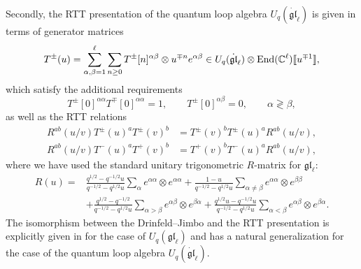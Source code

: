 Secondly, the RTT presentation \cite{molev_yangians_2007} of the quantum loop algebra $U_q(\dot{\mathfrak{gl}}_\ell)$ is given in terms of generator matrices
\begin{equation}
    T^\pm(u) = \sum_{\alpha,\beta=1}^\ell \sum_{n \geq 0} T^\pm[n]^{\alpha\beta} \otimes u^{\mp n} e^{\alpha\beta} \in U_q(\dot{\mathfrak{gl}}_\ell) \otimes \operatorname{End}(\mathbb{C}^\ell)\llbracket u^{\mp 1} \rrbracket,
\end{equation}
which satisfy the additional requirements 
\begin{equation}
    T^\pm[0]^{\alpha\alpha} T^\mp[0]^{\alpha\alpha} = 1, \qquad T^\pm[0]^{\alpha\beta} = 0, \qquad \alpha \gtrless \beta,
\end{equation}
as well as the RTT relations
\begin{align}\label{eq:RTT}
    R^{ab}(u/v) T^\pm(u)^a T^\pm(v)^b &= T^\pm(v)^b T^\pm(u)^a R^{ab}(u/v), \\
    R^{ab}(u/v) T^-(u)^a T^+(v)^b &= T^+(v)^b T^-(u)^a R^{ab}(u/v),
\end{align}
where we have used the standard unitary trigonometric $R$-matrix for $\mathfrak{gl}_\ell$:
\begin{equation}\label{eq:trigRMat}
    \begin{aligned}
        R(u) ={}& \frac{q^{1/2}-q^{-1/2} u}{q^{-1/2}-q^{1/2} u} \sum_\alpha e^{\alpha\alpha} \otimes e^{\alpha\alpha} + \frac{1-u}{q^{-1/2}-q^{1/2} u} \sum_{\alpha\neq\beta} e^{\alpha\alpha} \otimes e^{\beta\beta} \\
        &+ \frac{q^{1/2}-q^{-1/2}}{q^{-1/2}-q^{1/2} u} \sum_{\alpha>\beta} e^{\alpha\beta} \otimes e^{\beta\alpha} + \frac{q^{1/2} u-q^{-1/2} u}{q^{-1/2}-q^{1/2} u} \sum_{\alpha<\beta} e^{\alpha\beta} \otimes e^{\beta\alpha}.
    \end{aligned}
\end{equation}
The isomorphism between the Drinfeld--Jimbo and the RTT presentation is explicitly given in \cite{finkelberg_shifted_2019} for the case of $U_q(\mathfrak{gl}_\ell)$ and has a natural generalization for the case of the quantum loop algebra $U_q(\dot{\mathfrak{gl}}_\ell)$.


